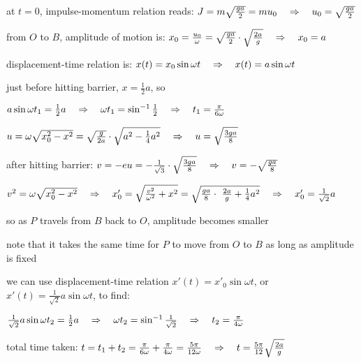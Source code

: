 at $t=0$, impulse-momentum relation reads: $J=m\sqrt{\frac{ga}{2}}=mu_0 \quad \Rightarrow \quad u_0 = \sqrt{\frac{ga}{2}}$

from $O$ to $B$, amplitude of motion is: $x_0 = \frac{u_0}{\omega} = \sqrt{\frac{ga}{2}} \cdot \sqrt{\frac{2a}{g}} \quad \Rightarrow \quad x_0 = a$

displacement-time relation is: $x(t)=x_0\sin\omega t \quad \Rightarrow \quad x(t)=a\sin\omega t $

just before hitting barrier, $x=\frac{1}{2}a$, so

{

\centering

$a\sin\omega t_1 = \frac{1}{2}a \quad \Rightarrow \quad \omega t_1 = \sin^{-1}\tfrac{1}{2} \quad \Rightarrow \quad t_1 = \frac{\pi}{6\omega}$

$u = \omega\sqrt{x_0^2-x^2} = \sqrt{\frac{g}{2a}} \cdot \sqrt{a^2-\frac{1}{4}a^2} \quad \Rightarrow \quad u=\sqrt{\frac{3ga}{8}}$

}

after hitting barrier: $v = -eu = -\frac{1}{\sqrt{3}}\cdot \sqrt{\frac{3ga}{8}} \quad \Rightarrow \quad v = -\sqrt{\frac{ga}{8}}$

{
	
\centering
	
$v^2 = \omega\sqrt{x_0^2-x^2} \RA x'_0 = \sqrt{\frac{v^2}{\omega^2} + x^2} = \sqrt{\frac{ga}{8} \cdot\ \frac{2a}{g} + \frac{1}{4}a^2} \RA x'_0 = \frac{1}{\sqrt{2}}a$

}

so as $P$ travels from $B$ back to $O$, amplitude becomes smaller

note that it takes the same time for $P$ to move from $O$ to $B$ as long as amplitude is fixed

we can use displacement-time relation $x'(t)=x'_0\sin\omega t$, or  $x'(t)=\frac{1}{\sqrt{2}}a\sin\omega t$, to find:

{
	
\centering
	
$ \frac{1}{\sqrt{2}}a\sin\omega t_2 = \frac{1}{2}a \quad \Rightarrow \quad \omega t_2 = \sin^{-1}\tfrac{1}{\sqrt{2}} \quad \Rightarrow \quad t_2 = \frac{\pi}{4\omega}$
	
}

total time taken: $t=t_1+t_2 = \frac{\pi}{6\omega}+\frac{\pi}{4\omega} = \frac{5\pi}{12\omega} \quad \Rightarrow \quad t=\frac{5\pi}{12} \sqrt{\frac{2a}{g}}$ \eoe
	

